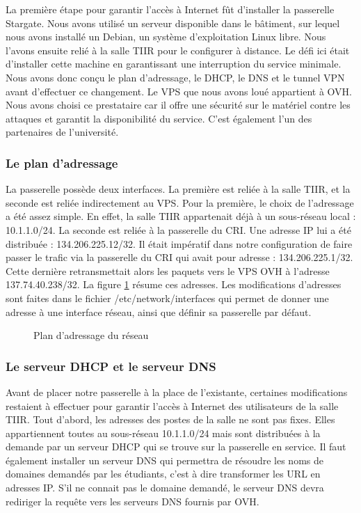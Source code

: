 La première étape pour garantir l'accès à Internet fût d'installer la passerelle Stargate. Nous avons utilisé un serveur disponible dans le bâtiment, sur lequel nous avons installé un Debian, un système d'exploitation Linux libre. Nous l'avons ensuite relié à la salle TIIR pour le configurer à distance. Le défi ici était d'installer cette machine en garantissant une interruption du service minimale. Nous avons donc conçu le plan d'adressage, le DHCP, le DNS et le tunnel VPN avant d'effectuer ce changement. Le VPS que nous avons loué appartient à OVH. Nous avons choisi ce prestataire car il offre une sécurité sur le matériel contre les attaques et garantit la disponibilité du service. C'est également l'un des partenaires de l'université.

\subsubsection{Le plan d'adressage}

La passerelle possède deux interfaces. La première est reliée à la salle TIIR, et la seconde est reliée indirectement au VPS. Pour la première, le choix de l'adressage a été assez simple. En effet, la salle TIIR appartenait déjà à un sous-réseau local : 10.1.1.0/24. La seconde est reliée à la passerelle du CRI. Une adresse IP lui a été distribuée : 134.206.225.12/32. Il était impératif dans notre configuration de faire passer le trafic via la passerelle du CRI qui avait pour adresse : 134.206.225.1/32. Cette dernière retransmettait alors les paquets vers le VPS OVH à l'adresse 137.74.40.238/32. La figure \ref{plan_adressage} résume ces adresses. Les modifications d'adresses sont faites dans le fichier /etc/network/interfaces qui permet de donner une adresse à une interface réseau, ainsi que définir sa passerelle par défaut.

\begin{figure}[!h]
\centering
\def\svgwidth{\columnwidth}

\caption{Plan d'adressage du réseau}
\label{plan_adressage}
\end{figure}

\subsubsection{Le serveur DHCP et le serveur DNS}

Avant de placer notre passerelle à la place de l'existante, certaines modifications restaient à effectuer pour garantir l'accès à Internet des utilisateurs de la salle TIIR. Tout d'abord, les adresses des postes de la salle ne sont pas fixes. Elles appartiennent toutes au sous-réseau 10.1.1.0/24 mais sont distribuées à la demande par un serveur DHCP qui se trouve sur la passerelle en service. Il faut également installer un serveur DNS qui permettra de résoudre les noms de domaines demandés par les étudiants, c'est à dire transformer les URL en adresses IP. S'il ne connait pas le domaine demandé, le serveur DNS devra rediriger la requête vers les serveurs DNS fournis par OVH. 

